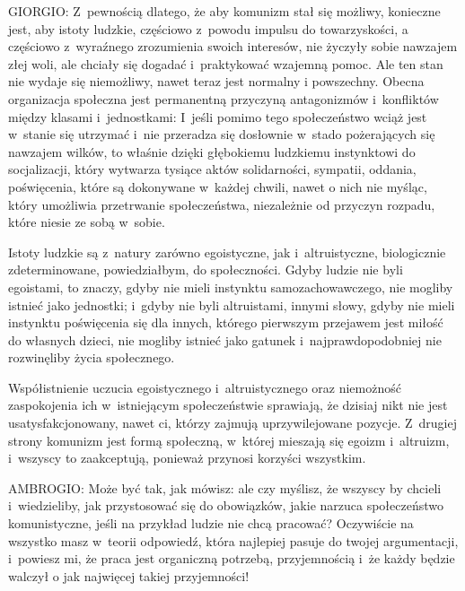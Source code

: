 \documentclass[oneside,polish,11pt,sfheadings]{mwbk}
\begin{document}
 
\noindent GIORGIO: Z~pewnością dlatego, że aby komunizm stał się możliwy, konieczne jest, aby istoty ludzkie, częściowo z~powodu
impulsu do towarzyskości, a częściowo z~wyraźnego zrozumienia swoich interesów, nie życzyły sobie nawzajem złej woli,
ale chciały się dogadać i~praktykować wzajemną pomoc. Ale ten stan nie wydaje się niemożliwy, nawet teraz jest normalny
i powszechny. Obecna organizacja społeczna jest permanentną przyczyną antagonizmów i~konfliktów między klasami i~jednostkami: I~jeśli pomimo tego społeczeństwo wciąż jest w~stanie się utrzymać i~nie przeradza się dosłownie w~stado
pożerających się nawzajem wilków, to właśnie dzięki głębokiemu ludzkiemu instynktowi do socjalizacji, który wytwarza
tysiące aktów solidarności, sympatii, oddania, poświęcenia, które są dokonywane w~każdej chwili, nawet o nich nie
myśląc, który umożliwia przetrwanie społeczeństwa, niezależnie od przyczyn rozpadu, które niesie ze sobą w~sobie. 

 
Istoty ludzkie są z~natury zarówno egoistyczne, jak i~altruistyczne, biologicznie zdeterminowane, powiedziałbym, do
społeczności. Gdyby ludzie nie byli egoistami, to znaczy, gdyby nie mieli instynktu samozachowawczego, nie mogliby
istnieć jako jednostki; i~gdyby nie byli altruistami, innymi słowy, gdyby nie mieli instynktu poświęcenia się dla
innych, którego pierwszym przejawem jest miłość do własnych dzieci, nie mogliby istnieć jako gatunek i~najprawdopodobniej nie rozwinęliby życia społecznego. 

 
Współistnienie uczucia egoistycznego i~altruistycznego oraz niemożność zaspokojenia ich w~istniejącym społeczeństwie
sprawiają, że dzisiaj nikt nie jest usatysfakcjonowany, nawet ci, którzy zajmują uprzywilejowane pozycje. Z~drugiej
strony komunizm jest formą społeczną, w~której mieszają się egoizm i~altruizm, i~wszyscy to zaakceptują, ponieważ
przynosi korzyści wszystkim. 




 
\noindent AMBROGIO: Może być tak, jak mówisz: ale czy myślisz, że wszyscy by chcieli i~wiedzieliby, jak przystosować się do
obowiązków, jakie narzuca społeczeństwo komunistyczne, jeśli na przykład ludzie nie chcą pracować? Oczywiście na
wszystko masz w~teorii odpowiedź, która najlepiej pasuje do twojej argumentacji, i~powiesz mi, że praca jest organiczną
potrzebą, przyjemnością i~że każdy będzie walczył o jak najwięcej takiej przyjemności! 
\end{document}
